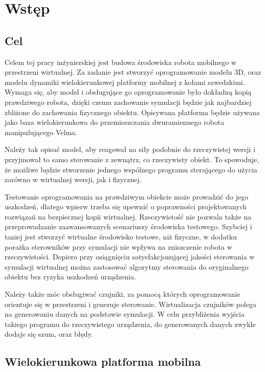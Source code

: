 \chapter{Wstęp}
\section{Cel}
Celem tej pracy inżynierskiej jest budowa środowiska robota mobilnego w przestrzeni wirtualnej.
Za zadanie jest stworzyć oprogramowanie modelu 3D, oraz modelu dynamiki wielokierunkowej platformy mobilnej z kołami szwedzkimi. 
Wymaga się, aby model i obsługujące go oprogramowanie było dokładną kopią prawdziwego robota, dzięki czemu zachowanie symulacji będzie jak najbardziej zbliżone do zachowania fizycznego obiektu.
Opisywana platforma będzie używana jako baza wielokierunkowa do przemieszczania dwuramiennego robota manipulującego Velma.

Należy tak opisać model, aby reagował na siły podobnie do rzeczywistej wersji i przyjmował to samo sterowanie z zewnątrz, co rzeczywisty obiekt.
To spowoduje, że możliwe będzie stworzenie jednego wspólnego programu sterującego do użycia zarówno w wirtualnej wersji, jak i fizycznej.

Testowanie oprogramowania na prawdziwym obiekcie może prowadzić do jego uszkodzeń, dlatego wpierw trzeba się upewnić o poprawności projektowanych rozwiązań na bezpiecznej kopii wirtualnej.
Rzeczywistość nie pozwala także na przeprowadzanie zaawansowanych scenariuszy środowiska testowego.
Szybciej i taniej jest stworzyć wirtualne środowisko testowe, niż fizyczne, w dodatku porażka sterowników przy symulacji nie wpływa na zniszczenie robota w rzeczywistości.
Dopiero przy osiągnięciu satysfakcjonującej jakości sterowania w symulacji wirtualnej można zastosować algorytmy sterowania do oryginalnego obiektu bez ryzyka uszkodzeń urządzenia.

Należy także móc obsługiwać czujniki, za pomocą których oprogramowanie orientuje się w przestrzeni i generuje sterowanie.
Wirtualizacja czujników polega na generowaniu danych na podstawie symulacji.
W celu przybliżenia wyjścia takiego programu do rzeczywistego urządzenia, do generowanych danych zwykle dodaje się szum, oraz błędy.

\section{Wielokierunkowa platforma mobilna}

